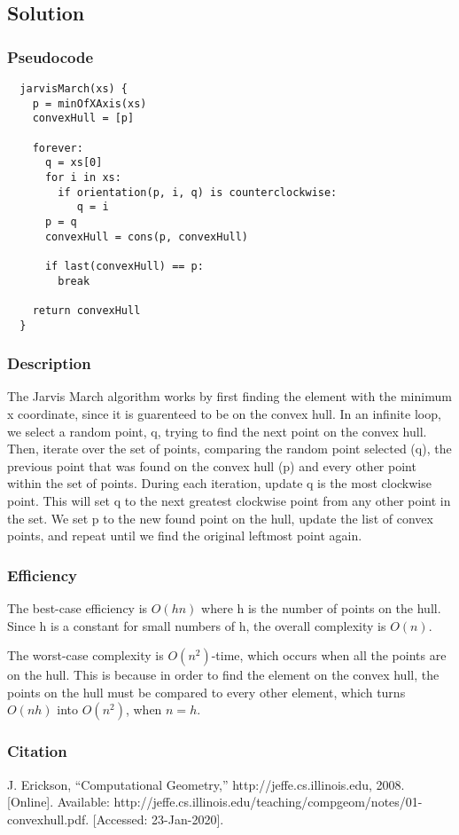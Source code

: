 \subsection*{Solution}
\subsubsection*{Pseudocode}
\begin{verbatim}
  jarvisMarch(xs) {
    p = minOfXAxis(xs)
    convexHull = [p]

    forever:
      q = xs[0]
      for i in xs:
        if orientation(p, i, q) is counterclockwise:
           q = i
      p = q
      convexHull = cons(p, convexHull)

      if last(convexHull) == p:
        break

    return convexHull
  }
\end{verbatim}

\subsubsection*{Description}
The Jarvis March algorithm works by first finding the element with the minimum x coordinate, since it is guarenteed to be on the convex hull. In an infinite loop, we select a random point, q, trying to find the next point on the convex hull. Then, iterate over the set of points, comparing the random point selected (q), the previous point that was found on the convex hull (p) and every other point within the set of points. During each iteration, update q is the most clockwise point. This will set q to the next greatest clockwise point from any other point in the set. We set p to the new found point on the hull, update the list of convex points, and repeat until we find the original leftmost point again.

\subsubsection*{Efficiency}

The best-case efficiency is $O(hn)$ where h is the number of points on the hull. Since h is a constant for small numbers of h, the overall complexity is $O(n)$.

The worst-case complexity is $O(n^2)$-time, which occurs when all the points are on the hull. This is because in order to find the element on the convex hull, the points on the hull must be compared to every other element, which turns $O(nh)$ into $O(n^{2})$, when $n = h$.

\subsubsection*{Citation}

J. Erickson, “Computational Geometry,” http://jeffe.cs.illinois.edu, 2008. [Online]. Available: http://jeffe.cs.illinois.edu/teaching/compgeom/notes/01-convexhull.pdf. [Accessed: 23-Jan-2020].
